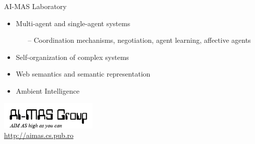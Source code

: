 \documentclass{beamer}
\begin{document}
\begin{frame}[t]
	\begin{center}
		\Huge{AI-MAS Laboratory}
	\end{center}
	\vspace*{1em}
	
	\begin{itemize}
		\item Multi-agent and single-agent systems
			\begin{itemize}
				\item[--] Coordination mechanisms, negotiation, agent learning, affective agents
			\end{itemize}
		\item Self-organization of complex systems
		\item Web semantics and semantic representation
		\item Ambient Intelligence
	\end{itemize}
	
	\begin{center}
		\includegraphics[width=0.35\textwidth]{graphics/intro/aimas-logo}\\%
		\url{http://aimas.cs.pub.ro}
	\end{center}
\end{frame}
\end{document}
